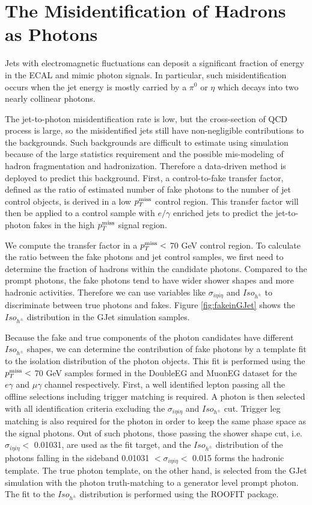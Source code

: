 \documentclass[thesis.tex]{subfiles}
\renewcommand\_{\textunderscore\allowbreak}
\begin{document}
\section{The Misidentification of Hadrons as Photons}\label{sec:jetfakepho}
Jets with electromagnetic fluctuations can deposit a significant fraction of energy in the ECAL and mimic photon signals. In particular, such misidentification occurs when the jet energy is mostly carried by a $\pi^0$ or $\eta$ which decays into two nearly collinear photons. 

The jet-to-photon misidentification rate is low, but the cross-section of QCD process is large, so the misidentified jets still have non-negligible contributions to the backgrounds. Such backgrounds are difficult to estimate using simulation because of the large statistics requirement and the possible mis-modeling of hadron fragmentation and hadronization. Therefore a data-driven method is deployed to predict this background. First, a control-to-fake transfer factor, defined as the ratio of estimated number of fake photons to the number of jet control objects, is derived in a low $p_T^\textrm{miss}$ control region. This transfer factor will then be applied to a control sample with $e/\gamma$ enriched jets to predict the jet-to-photon fakes in the high $p_T^\textrm{miss}$ signal region. 

We compute the transfer factor in a $p_T^\textrm{miss} < $ 70 GeV control region. To calculate the ratio between the fake photons and jet control samples, we first need to determine the fraction of hadrons within the candidate photons.  Compared to the prompt photons, the fake photons tend to have wider shower shapes and more hadronic activities. Therefore we can use variables like $\sigma_{i\eta i\eta}$ and $Iso_{h^\pm}$ to discriminate between true photons and fakes. Figure \ref{fig:fakeinGJet} shows the $Iso_{h^\pm}$ distribution in the GJet simulation samples. 

Because the fake and true components of the photon candidates have different $Iso_{h^\pm}$ shapes, we can determine the contribution of fake photons by a template fit to the isolation distribution of the photon objects. This fit is performed using the $p_T^\textrm{miss} <$ 70 GeV samples formed in the DoubleEG and MuonEG dataset for the $e\gamma$ and $\mu\gamma$ channel respectively. First, a well identified lepton passing all the offline selections including trigger matching is required. A photon is then selected with all identification criteria excluding the $\sigma_{i\eta i\eta}$ and $Iso_{h^\pm}$ cut. Trigger leg matching is also required for the photon in order to keep the same phase space as the signal photons. Out of such photons, those passing the shower shape cut, i.e. $\sigma_{i\eta i\eta} <$ 0.01031, are used as the fit target, and the $Iso_{h^\pm}$ distribution of the photons falling in the sideband 0.01031 $< \sigma_{i\eta i\eta} <$ 0.015 forms the hadronic template. The true photon template, on the other hand, is selected from the GJet simulation with the photon truth-matching to a generator level prompt photon. The fit to the $Iso_{h^\pm}$ distribution is performed using the ROOFIT package. 
\end{document}
